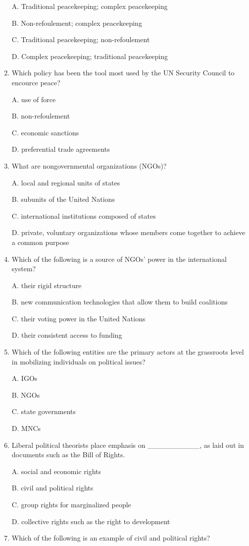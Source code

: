 \documentclass[
]{book}
\begin{document}
\begin{enumerate}
  A. Traditional peacekeeping; complex peacekeeping

  B. Non-refoulement; complex peacekeeping

  C. Traditional peacekeeping; non-refoulement

  D. Complex peacekeeping; traditional peacekeeping
\item
  Which policy has been the tool most used by the UN Security Council to encource peace?

  A. use of force

  B. non-refoulement

  C. economic sanctions

  D. preferential trade agreements
\item
  What are nongovernmental organizations (NGOs)?

  A. local and regional units of states

  B. subunits of the United Nations

  C. international institutions composed of states

  D. private, voluntary organizations whose members come together to achieve a common purpose
\item
  Which of the following is a source of NGOs' power in the international system?

  A. their rigid structure

  B. new communication technologies that allow them to build coalitions

  C. their voting power in the United Nations

  D. their consistent access to funding
\item
  Which of the following entities are the primary actors at the grassroots level in mobilizing individuals on political issues?

  A. IGOs

  B. NGOs

  C. state governments

  D. MNCs
\item
  Liberal political theorists place emphasis on \_\_\_\_\_\_\_\_\_\_, as laid out in documents such as the Bill of Rights.

  A. social and economic rights

  B. civil and political rights

  C. group rights for marginalized people

  D. collective rights such as the right to development
\item
  Which of the following is an example of civil and political rights?


\end{enumerate}
\end{document}
